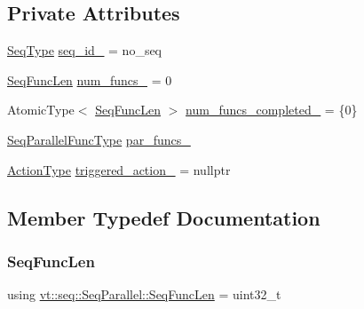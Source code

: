 \subsection*{Private Attributes}
\begin{DoxyCompactItemize}
\item 
\hyperlink{namespacevt_1_1seq_a3b612da217ac669d39c159f134ab8434}{Seq\+Type} \hyperlink{structvt_1_1seq_1_1_seq_parallel_ab61984f3168ba08ff5c234525a3bdf20}{seq\+\_\+id\+\_\+} = no\+\_\+seq
\item 
\hyperlink{structvt_1_1seq_1_1_seq_parallel_ab6a1d3fc6dbc5210e559c96f57f64e79}{Seq\+Func\+Len} \hyperlink{structvt_1_1seq_1_1_seq_parallel_a0a8788e8bccd3cad793c40519e0c05ce}{num\+\_\+funcs\+\_\+} = 0
\item 
Atomic\+Type$<$ \hyperlink{structvt_1_1seq_1_1_seq_parallel_ab6a1d3fc6dbc5210e559c96f57f64e79}{Seq\+Func\+Len} $>$ \hyperlink{structvt_1_1seq_1_1_seq_parallel_af1ad85bbdeccb88608635c5ca0ce860c}{num\+\_\+funcs\+\_\+completed\+\_\+} = \{0\}
\item 
\hyperlink{structvt_1_1seq_1_1_seq_parallel_a5804979becb9986676dcba10487eb8de}{Seq\+Parallel\+Func\+Type} \hyperlink{structvt_1_1seq_1_1_seq_parallel_ad4e7afa9903b89d95345c5660638253d}{par\+\_\+funcs\+\_\+}
\item 
\hyperlink{namespacevt_ae0a5a7b18cc99d7b732cb4d44f46b0f3}{Action\+Type} \hyperlink{structvt_1_1seq_1_1_seq_parallel_afe81bb915b8468c37aeb041d97bc4ddc}{triggered\+\_\+action\+\_\+} = nullptr
\end{DoxyCompactItemize}


\subsection{Member Typedef Documentation}
\mbox{\label{structvt_1_1seq_1_1_seq_parallel_ab6a1d3fc6dbc5210e559c96f57f64e79}} 
\subsubsection{\texorpdfstring{Seq\+Func\+Len}{SeqFuncLen}}
{\footnotesize\ttfamily using \hyperlink{structvt_1_1seq_1_1_seq_parallel_ab6a1d3fc6dbc5210e559c96f57f64e79}{vt\+::seq\+::\+Seq\+Parallel\+::\+Seq\+Func\+Len} =  uint32\+\_\+t}

